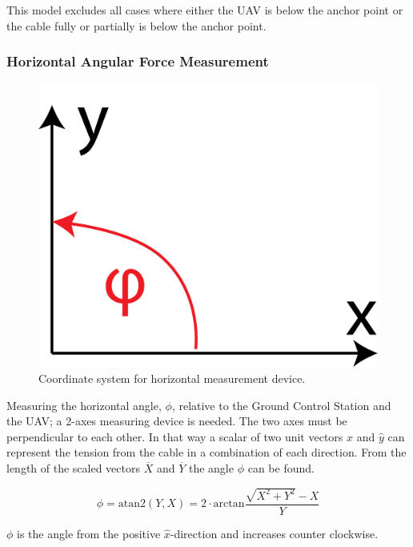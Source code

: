\noindent
This model excludes all cases where either the UAV is below the anchor point or the cable fully or partially is below the anchor point.



   

\subsubsection{Horizontal Angular Force Measurement}
\label{sec:horizontalMeasurementAnalysis}
\begin{figure}[hbtp]
\centering
\includegraphics[scale=0.25]{graphics/horizontal_coordinatesystem.png}
\caption{Coordinate system for horizontal measurement device.}
\end{figure}

\noindent
Measuring the horizontal angle, $\phi$, relative to the Ground Control Station and the UAV; a 2-axes measuring device is needed. The two axes must be perpendicular to each other. In that way a scalar of two unit vectors $\hat{x}$ and $\hat{y}$ can represent the tension from the cable in a combination of each direction. 
From the length of the scaled vectors $\overline{X}$ and $\overline{Y}$ the angle $\phi$ can be found.

\begin{equation}
\phi = \mathrm{atan2} (Y,  X) = 2 \cdot \mathrm{arctan} \frac{\sqrt{X^2+Y^2}-X}{Y}
\end{equation}

\noindent
$\phi$ is the angle from the positive $\hat{x}$-direction and increases counter clockwise. 

